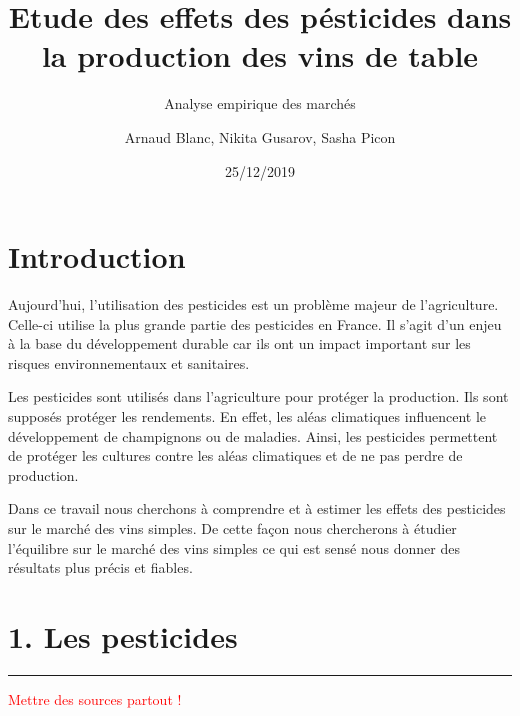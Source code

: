 \documentclass[11pt,]{article}
\title{Etude des effets des pésticides dans la production des vins de table}
\subtitle{Analyse empirique des marchés}
\author{Arnaud Blanc, Nikita Gusarov, Sasha Picon}
\date{25/12/2019}
\begin{document}
\maketitle


\hypersetup{linkcolor = black}

\tableofcontents





\newpage

\hypersetup{linkcolor = blue}

\hypertarget{introduction}{%
\section{Introduction}\label{introduction}}

Aujourd'hui, l'utilisation des pesticides est un problème majeur de
l'agriculture.\\
Celle-ci utilise la plus grande partie des pesticides en France. Il
s'agit d'un enjeu à la base du développement durable car ils ont un
impact important sur les risques environnementaux et sanitaires.

Les pesticides sont utilisés dans l'agriculture pour protéger la
production. Ils sont supposés protéger les rendements. En effet, les
aléas climatiques influencent le développement de champignons ou de
maladies. Ainsi, les pesticides permettent de protéger les cultures
contre les aléas climatiques et de ne pas perdre de production.

Dans ce travail nous cherchons à comprendre et à estimer les effets des
pesticides sur le marché des vins simples. De cette façon nous
chercherons à étudier l'équilibre sur le marché des vins simples ce qui
est sensé nous donner des résultats plus précis et fiables.

\hypertarget{les-pesticides}{%
\section{1. Les pesticides}\label{les-pesticides}}

\noindent

\rule[0.5ex]{\linewidth}{1pt}

\textcolor{red}{Mettre des sources partout !}
\end{document}
